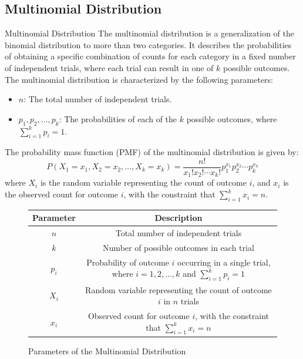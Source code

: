 \documentclass[openany]{book}
\begin{document}
\subsection{Multinomial Distribution}
\begin{mydefinition}{Multinomial Distribution}
    The multinomial distribution is a generalization of the binomial distribution to more than two categories. It describes the probabilities of obtaining a specific combination of counts for each category in a fixed number of independent trials, where each trial can result in one of $k$ possible outcomes. The multinomial distribution is characterized by the following parameters:
    \begin{itemize}
        \item $n$: The total number of independent trials.
        \item $p_1, p_2, \ldots, p_k$: The probabilities of each of the $k$ possible outcomes, where $\sum_{i=1}^{k} p_i = 1$.
    \end{itemize}
    The probability mass function (PMF) of the multinomial distribution is given by:
    $$P(X_1 = x_1, X_2 = x_2, \ldots, X_k = x_k) = \frac{n!}{x_1! x_2! \cdots x_k!} p_1^{x_1} p_2^{x_2} \cdots p_k^{x_k}$$
    where $X_i$ is the random variable representing the count of outcome $i$, and $x_i$ is the observed count for outcome $i$, with the constraint that $\sum_{i=1}^{k} x_i = n$.
\end{mydefinition}
\begin{figure}[H]
\begin{tabular}{c|c}
    \hline
    Parameter & Description \\
    \hline
    $n$ & Total number of independent trials \\
    $k$ & Number of possible outcomes in each trial \\
    $p_i$ & Probability of outcome $i$ occurring in a single trial, where $i = 1, 2, \ldots, k$ and $\sum_{i=1}^{k} p_i = 1$ \\
    $X_i$ & Random variable representing the count of outcome $i$ in $n$ trials \\
    $x_i$ & Observed count for outcome $i$, with the constraint that $\sum_{i=1}^{k} x_i = n$ \\
    \hline
\end{tabular} 
\caption{Parameters of the Multinomial Distribution}
\end{figure}
\end{document}
